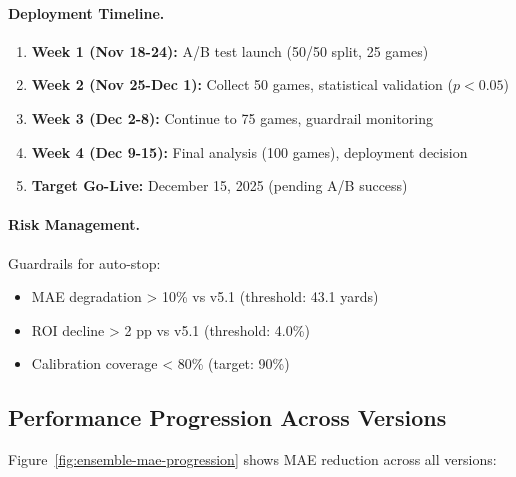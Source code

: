 \paragraph{Deployment Timeline.}
\begin{enumerate}[itemsep=2pt,parsep=0pt]
    \item \textbf{Week 1 (Nov 18-24):} A/B test launch (50/50 split, 25 games)
    \item \textbf{Week 2 (Nov 25-Dec 1):} Collect 50 games, statistical validation ($p < 0.05$)
    \item \textbf{Week 3 (Dec 2-8):} Continue to 75 games, guardrail monitoring
    \item \textbf{Week 4 (Dec 9-15):} Final analysis (100 games), deployment decision
    \item \textbf{Target Go-Live:} December 15, 2025 (pending A/B success)
\end{enumerate}

\paragraph{Risk Management.}
Guardrails for auto-stop:
\begin{itemize}[itemsep=2pt,parsep=0pt]
    \item MAE degradation > 10\% vs v5.1 (threshold: 43.1 yards)
    \item ROI decline > 2 pp vs v5.1 (threshold: 4.0\%)
    \item Calibration coverage < 80\% (target: 90\%)
\end{itemize}

\subsection{Performance Progression Across Versions}

Figure~\ref{fig:ensemble-mae-progression} shows MAE reduction across all versions:

